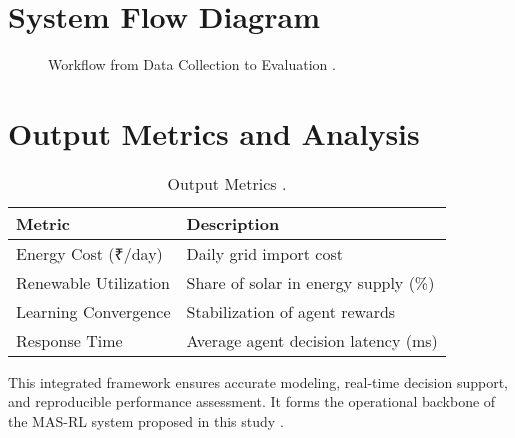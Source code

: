 \documentclass[12pt]{report}
\begin{document}
\section{System Flow Diagram}
\begin{doublespace}
\begin{figure}[h]
    \centering
    \caption{Workflow from Data Collection to Evaluation \cite{MNRE2023}.}
    \label{fig:workflow}
\end{figure}
\end{doublespace}

\section{Output Metrics and Analysis}
\begin{doublespace}
\begin{table}[h]
    \centering
    \caption{Output Metrics \cite{MNRE2023}.}
    \label{tab:output_metrics}
    \begin{tabular}{ll}
        \toprule
        \textbf{Metric} & \textbf{Description} \\
        \midrule
        Energy Cost (₹/day) & Daily grid import cost \\
        Renewable Utilization & Share of solar in energy supply (\%) \\
        Learning Convergence & Stabilization of agent rewards \\
        Response Time & Average agent decision latency (ms) \\
        \bottomrule
    \end{tabular}
\end{table}
This integrated framework ensures accurate modeling, real-time decision support, and reproducible performance assessment. It forms the operational backbone of the MAS-RL system proposed in this study \cite{MNRE2023}.
\end{doublespace}
\end{document}
